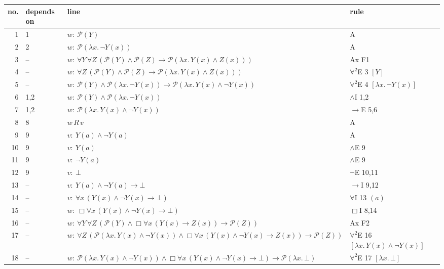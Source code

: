 {\footnotesize\setlength{\tabcolsep}{4pt}
\begin{longtable}{@{}r>{\raggedright}p{}p{}>{\raggedright\arraybackslash}p{}@{}}\toprule
no. & depends on & line & rule\\\midrule\endhead
1 & 1 & $w:\ \mathcal{P}(Y)$ & A\\
2 & 2 & $w:\ \mathcal{P}(\lambda x.\,\neg Y(x))$ & A\\
3 & -- & $w:\ \forall Y\, \forall Z\, (\mathcal{P}(Y) \wedge \mathcal{P}(Z) \to \mathcal{P}(\lambda x.\,Y(x) \wedge Z(x)))$ & Ax F1\\
4 & -- & $w:\ \forall Z\, (\mathcal{P}(Y) \wedge \mathcal{P}(Z) \to \mathcal{P}(\lambda x.\,Y(x) \wedge Z(x)))$ & $\forall^2$E 3 $[Y]$\\
5 & -- & $w:\ \mathcal{P}(Y) \wedge \mathcal{P}(\lambda x.\,\neg Y(x)) \to \mathcal{P}(\lambda x.\,Y(x) \wedge \neg Y(x))$ & $\forall^2$E 4 $[\lambda x.\,\neg Y(x)]$\\
6 & 1,2 & $w:\ \mathcal{P}(Y) \wedge \mathcal{P}(\lambda x.\,\neg Y(x))$ & $\wedge$I 1,2\\
7 & 1,2 & $w:\ \mathcal{P}(\lambda x.\,Y(x) \wedge \neg Y(x))$ & $\to$E 5,6\\
8 & 8 & $w\,R\,v$ & A\\
9 & 9 & $v:\ Y(a) \wedge \neg Y(a)$ & A\\
10 & 9 & $v:\ Y(a)$ & $\wedge$E 9\\
11 & 9 & $v:\ \neg Y(a)$ & $\wedge$E 9\\
12 & 9 & $v:\ \bot$ & $\neg$E 10,11\\
13 & -- & $v:\ Y(a) \wedge \neg Y(a) \to \bot$ & $\to$I 9,12\\
14 & -- & $v:\ \forall x\, (Y(x) \wedge \neg Y(x) \to \bot)$ & $\forall$I 13 $(a)$\\
15 & -- & $w:\ \Box \forall x\, (Y(x) \wedge \neg Y(x) \to \bot)$ & $\Box$I 8,14\\
16 & -- & $w:\ \forall Y\, \forall Z\, (\mathcal{P}(Y) \wedge \Box \forall x\, (Y(x) \to Z(x)) \to \mathcal{P}(Z))$ & Ax F2\\
17 & -- & $w:\ \forall Z\, (\mathcal{P}(\lambda x.\,Y(x) \wedge \neg Y(x)) \wedge \Box \forall x\, (Y(x) \wedge \neg Y(x) \to Z(x)) \to \mathcal{P}(Z))$ & $\forall^2$E 16 $[\lambda x.\,Y(x) \wedge \neg Y(x)]$\\
18 & -- & $w:\ \mathcal{P}(\lambda x.\,Y(x) \wedge \neg Y(x)) \wedge \Box \forall x\, (Y(x) \wedge \neg Y(x) \to \bot) \to \mathcal{P}(\lambda x.\,\bot)$ & $\forall^2$E 17 $[\lambda x.\,\bot]$\\

\end{longtable}}
